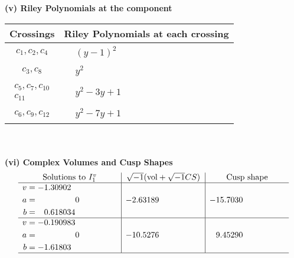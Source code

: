 \documentclass[1p]{elsarticle_modified}
\theoremstyle{definition}
\newcommand{\I}{\sqrt{-1}}
\begin{document}
\newpage\renewcommand{\arraystretch}{1}
\flushleft \textbf{(v) Riley Polynomials at the component}\newline \\
\begin{tabular}{m{50pt}|m{274pt}}
Crossings & \hspace{64pt}Riley Polynomials at each crossing \\
\hline $$\begin{aligned}c_{1},c_{2},c_{4}\end{aligned}$$&$\begin{aligned}
&(y-1)^2
\end{aligned}$\\
\hline $$\begin{aligned}c_{3},c_{8}\end{aligned}$$&$\begin{aligned}
&y^2
\end{aligned}$\\
\hline $$\begin{aligned}c_{5},c_{7},c_{10}\\c_{11}\end{aligned}$$&$\begin{aligned}
&y^2-3 y+1
\end{aligned}$\\
\hline $$\begin{aligned}c_{6},c_{9},c_{12}\end{aligned}$$&$\begin{aligned}
&y^2-7 y+1
\end{aligned}$\\
\hline
\end{tabular}\\~\\
\newpage\flushleft \textbf{(vi) Complex Volumes and Cusp Shapes}
$$\begin{array}{c|c|c}  
\text{Solutions to }I^v_{1}& \I (\text{vol} + \sqrt{-1}CS) & \text{Cusp shape}\\
 \hline 
\begin{aligned}
v &= -1.30902\phantom{ +0.000000I} \\
a &= \phantom{-0.000000 } 0 \\
b &= \phantom{-}0.618034\phantom{ +0.000000I}\end{aligned}
 & -2.63189\phantom{ +0.000000I} & -15.7030\phantom{ +0.000000I} \\ \hline\begin{aligned}
v &= -0.190983\phantom{ +0.000000I} \\
a &= \phantom{-0.000000 } 0 \\
b &= -1.61803\phantom{ +0.000000I}\end{aligned}
 & -10.5276\phantom{ +0.000000I} & \phantom{-}9.45290\phantom{ +0.000000I}\\
 \hline 
 \end{array}$$\newpage
\end{document}
